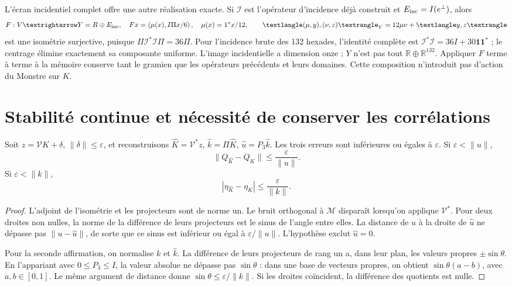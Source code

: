L’écran incidentiel complet offre une autre réalisation exacte. Si
\(\mathcal I\) est l’opérateur d’incidence déjà construit et
\(E_{\rm inc}=\mathcal I(e^\perp)\), alors
\begin{equation}
 F:V\longrightarrow Y=\mathbb R\oplus E_{\rm inc},\quad
 Fx=\left(\mu(x),\frac{\mathcal I\Pi x}{6}\right),\quad
 \mu(x)=\frac{\mathbf1^*x}{12},\qquad
 \langle(\mu,y),(\nu,z)\rangle_Y=12\mu\nu+\langle y,z\rangle
 \label{x_reciprocidad:lib01:incidencia-F}
\end{equation}
est une isométrie surjective, puisque
\(\Pi\mathcal I^*\mathcal I\Pi=36\Pi\). Pour l’incidence
brute des 132 hexades, l’identité complète est
\(\mathcal I^*\mathcal I=36I+30\mathbf1\mathbf1^*\) ; le
centrage élimine exactement sa composante uniforme. L’image incidentielle a
dimension onze ; \(Y\) n’est pas tout \(\mathbb R\oplus\mathbb R^{132}\).
Appliquer \(F\) terme à terme à la mémoire conserve tant le gramien
que les opérateurs précédents et leurs domaines. Cette
composition n’introduit pas d’action du Monstre sur \(K\).

\section{Stabilité continue et nécessité de conserver les corrélations}
\label{x_reciprocidad:lib01:ruido}

\begin{theorem}
\label{x_reciprocidad:lib01:error-proyectores}
Soit \(z=\mathcal VK+\delta\), \(\|\delta\|\leq\varepsilon\), et reconstruisons \(\widehat K=\mathcal V^*z\), \(\widehat k=\Pi\widehat K\), \(\widehat u=P_3\widehat k\). Les trois erreurs sont inférieures ou égales à \(\varepsilon\). Si \(\varepsilon<\|u\|\),
\[
 \|Q_{\widehat K}-Q_K\|\leq\frac\varepsilon{\|u\|}.
\]
Si \(\varepsilon<\|k\|\),
\[
 |\eta_{\widehat K}-\eta_K|\leq\frac\varepsilon{\|k\|}.
\]
\end{theorem}
\begin{proof}
L’adjoint de l’isométrie et les projecteurs sont de norme un. Le bruit
orthogonal à \(\mathcal M\) disparaît lorsqu’on applique \(\mathcal V^*\).
Pour deux droites non nulles, la norme de la différence de leurs projecteurs est
le sinus de l’angle entre elles. La distance de \(u\) à la droite de
\(\widehat u\) ne dépasse pas \(\|u-\widehat u\|\), de sorte que ce
sinus est inférieur ou égal à \(\varepsilon/\|u\|\). L’hypothèse
exclut \(\widehat u=0\).

Pour la seconde affirmation, on normalise \(k\) et \(\widehat k\). La différence de leurs projecteurs de rang un a, dans leur plan, les valeurs propres \(\pm\sin\theta\). En l'appariant avec \(0\leq P_3\leq I\), la valeur absolue ne dépasse pas \(\sin\theta\) : dans une base de vecteurs propres, on obtient \(\sin\theta(a-b)\), avec \(a,b\in[0,1]\). Le même argument de distance donne \(\sin\theta\leq\varepsilon/\|k\|\). Si les droites coïncident, la différence des quotients est nulle.
\end{proof}


